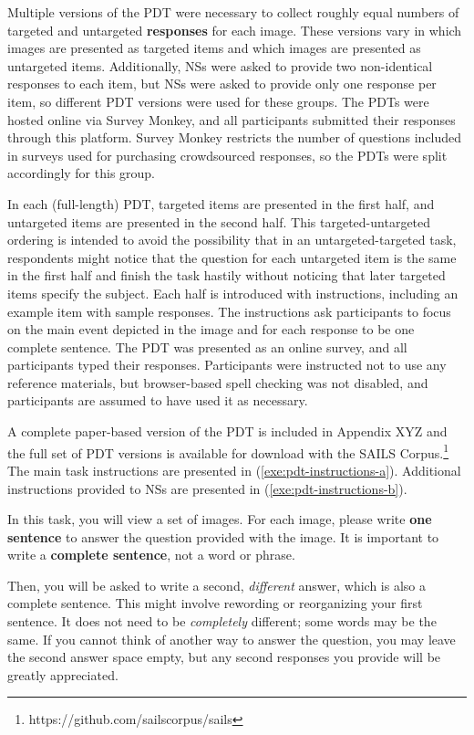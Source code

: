 Multiple versions of the PDT were necessary to collect roughly equal numbers of targeted and untargeted \textbf{responses} for each image. These versions vary in which images are presented as targeted items and which images are presented as untargeted items. Additionally, NSs were asked to provide two non-identical responses to each item, but NSs were asked to provide only one response per item, so different PDT versions were used for these groups. The PDTs were hosted online via Survey Monkey, and all participants submitted their responses through this platform. Survey Monkey restricts the number of questions included in surveys used for purchasing crowdsourced responses, so the PDTs were split accordingly for this group.

In each (full-length) PDT, targeted items are presented in the first half, and untargeted items are presented in the second half. This targeted-untargeted ordering is intended to avoid the possibility that in an untargeted-targeted task, respondents might notice that the question for each untargeted item is the same in the first half and finish the task hastily without noticing that later targeted items specify the subject. Each half is introduced with instructions, including an example item with sample responses. The instructions ask participants to focus on the main event depicted in the image and for each response to be one complete sentence. The PDT was presented as an online survey, and all participants typed their responses. Participants were instructed not to use any reference materials, but browser-based spell checking was not disabled, and participants are assumed to have used it as necessary.

A complete paper-based version of the PDT is included in Appendix XYZ  and the full set of PDT versions is available for download with the SAILS Corpus.\footnote{https://github.com/sailscorpus/sails} The main task instructions are presented in (\ref{exe:pdt-instructions-a}). Additional instructions provided to NSs are presented in (\ref{exe:pdt-instructions-b}).

\begin{exe}
  \ex\label{exe:pdt-instructions-a}In this task, you will view a set of images. For each image, please write \textbf{one sentence} to answer the question provided with the image. It is important to write a \textbf{complete sentence}, not a word or phrase.
\end{exe}

\begin{exe}
  \ex\label{exe:pdt-instructions-b}Then, you will be asked to write a second, \textit{different} answer, which is also a complete sentence. This might involve rewording or reorganizing your first sentence. It does not need to be \textit{completely} different; some words may be the same. If you cannot think of another way to answer the question, you may leave the second answer space empty, but any second responses you provide will be greatly appreciated.
\end{exe}

